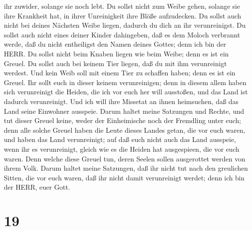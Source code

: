 ihr zuwider, solange sie noch lebt.  Du sollst nicht zum
Weibe gehen, solange sie ihre Krankheit hat, in ihrer Unreinigkeit ihre
Blöße aufzudecken.  Du sollst auch nicht bei deines
Nächsten Weibe liegen, dadurch du dich an ihr verunreinigst.
 Du sollst auch nicht eines deiner Kinder dahingeben, daß
es dem Moloch verbrannt werde, daß du nicht entheiligst den Namen deines
Gottes; denn ich bin der HERR.  Du sollst nicht beim Knaben
liegen wie beim Weibe; denn es ist ein Greuel.  Du sollst
auch bei keinem Tier liegen, daß du mit ihm verunreinigt werdest. Und
kein Weib soll mit einem Tier zu schaffen haben; denn es ist ein Greuel.
 Ihr sollt euch in dieser keinem verunreinigen; denn in
diesem allem haben sich verunreinigt die Heiden, die ich vor euch her
will ausstoßen,  und das Land ist dadurch verunreinigt. Und
ich will ihre Missetat an ihnen heimsuchen, daß das Land seine Einwohner
ausspeie.  Darum haltet meine Satzungen und Rechte, und tut
dieser Greuel keine, weder der Einheimische noch der Fremdling unter
euch;  denn alle solche Greuel haben die Leute dieses
Landes getan, die vor euch waren, und haben das Land verunreinigt;
 auf daß euch nicht auch das Land ausspeie, wenn ihr es
verunreinigt, gleich wie es die Heiden hat ausgespieen, die vor euch
waren.  Denn welche diese Greuel tun, deren Seelen sollen
ausgerottet werden von ihrem Volk.  Darum haltet meine
Satzungen, daß ihr nicht tut nach den greulichen Sitten, die vor euch
waren, daß ihr nicht damit verunreinigt werdet; denn ich bin der HERR,
euer Gott.

\hypertarget{section-18}{%
\section{19}\label{section-18}}

